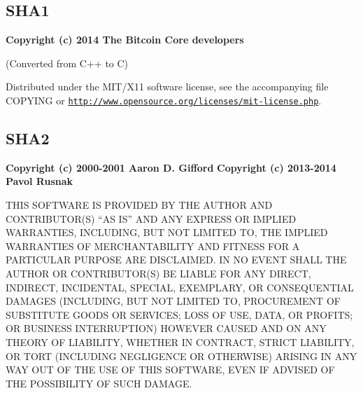 \subsection*{S\-H\-A1}

{\bfseries Copyright (c) 2014 The Bitcoin Core developers}

(Converted from C++ to C)

Distributed under the M\-I\-T/\-X11 software license, see the accompanying file C\-O\-P\-Y\-I\-N\-G or \href{http://www.opensource.org/licenses/mit-license.php}{\tt http\-://www.\-opensource.\-org/licenses/mit-\/license.\-php}.

\subsection*{S\-H\-A2}

{\bfseries Copyright (c) 2000-\/2001 Aaron D. Gifford} {\bfseries Copyright (c) 2013-\/2014 Pavol Rusnak}

T\-H\-I\-S S\-O\-F\-T\-W\-A\-R\-E I\-S P\-R\-O\-V\-I\-D\-E\-D B\-Y T\-H\-E A\-U\-T\-H\-O\-R A\-N\-D C\-O\-N\-T\-R\-I\-B\-U\-T\-O\-R(\-S) ``\-A\-S I\-S'' A\-N\-D A\-N\-Y E\-X\-P\-R\-E\-S\-S O\-R I\-M\-P\-L\-I\-E\-D W\-A\-R\-R\-A\-N\-T\-I\-E\-S, I\-N\-C\-L\-U\-D\-I\-N\-G, B\-U\-T N\-O\-T L\-I\-M\-I\-T\-E\-D T\-O, T\-H\-E I\-M\-P\-L\-I\-E\-D W\-A\-R\-R\-A\-N\-T\-I\-E\-S O\-F M\-E\-R\-C\-H\-A\-N\-T\-A\-B\-I\-L\-I\-T\-Y A\-N\-D F\-I\-T\-N\-E\-S\-S F\-O\-R A P\-A\-R\-T\-I\-C\-U\-L\-A\-R P\-U\-R\-P\-O\-S\-E A\-R\-E D\-I\-S\-C\-L\-A\-I\-M\-E\-D. I\-N N\-O E\-V\-E\-N\-T S\-H\-A\-L\-L T\-H\-E A\-U\-T\-H\-O\-R O\-R C\-O\-N\-T\-R\-I\-B\-U\-T\-O\-R(\-S) B\-E L\-I\-A\-B\-L\-E F\-O\-R A\-N\-Y D\-I\-R\-E\-C\-T, I\-N\-D\-I\-R\-E\-C\-T, I\-N\-C\-I\-D\-E\-N\-T\-A\-L, S\-P\-E\-C\-I\-A\-L, E\-X\-E\-M\-P\-L\-A\-R\-Y, O\-R C\-O\-N\-S\-E\-Q\-U\-E\-N\-T\-I\-A\-L D\-A\-M\-A\-G\-E\-S (I\-N\-C\-L\-U\-D\-I\-N\-G, B\-U\-T N\-O\-T L\-I\-M\-I\-T\-E\-D T\-O, P\-R\-O\-C\-U\-R\-E\-M\-E\-N\-T O\-F S\-U\-B\-S\-T\-I\-T\-U\-T\-E G\-O\-O\-D\-S O\-R S\-E\-R\-V\-I\-C\-E\-S; L\-O\-S\-S O\-F U\-S\-E, D\-A\-T\-A, O\-R P\-R\-O\-F\-I\-T\-S; O\-R B\-U\-S\-I\-N\-E\-S\-S I\-N\-T\-E\-R\-R\-U\-P\-T\-I\-O\-N) H\-O\-W\-E\-V\-E\-R C\-A\-U\-S\-E\-D A\-N\-D O\-N A\-N\-Y T\-H\-E\-O\-R\-Y O\-F L\-I\-A\-B\-I\-L\-I\-T\-Y, W\-H\-E\-T\-H\-E\-R I\-N C\-O\-N\-T\-R\-A\-C\-T, S\-T\-R\-I\-C\-T L\-I\-A\-B\-I\-L\-I\-T\-Y, O\-R T\-O\-R\-T (I\-N\-C\-L\-U\-D\-I\-N\-G N\-E\-G\-L\-I\-G\-E\-N\-C\-E O\-R O\-T\-H\-E\-R\-W\-I\-S\-E) A\-R\-I\-S\-I\-N\-G I\-N A\-N\-Y W\-A\-Y O\-U\-T O\-F T\-H\-E U\-S\-E O\-F T\-H\-I\-S S\-O\-F\-T\-W\-A\-R\-E, E\-V\-E\-N I\-F A\-D\-V\-I\-S\-E\-D O\-F T\-H\-E P\-O\-S\-S\-I\-B\-I\-L\-I\-T\-Y O\-F S\-U\-C\-H D\-A\-M\-A\-G\-E.

